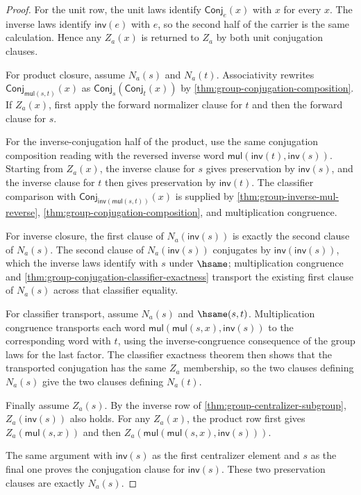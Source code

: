 \begin{proof}
For the unit row, the unit laws identify $\mathsf{Conj}_e(x)$ with $x$ for
every $x$. The inverse laws identify $\mathsf{inv}(e)$ with $e$, so the
second half of the carrier is the same calculation. Hence any $Z_a(x)$ is
returned to $Z_a$ by both unit conjugation clauses.

For product closure, assume $N_a(s)$ and $N_a(t)$. Associativity rewrites
$\mathsf{Conj}_{\mathsf{mul}(s,t)}(x)$ as
$\mathsf{Conj}_s(\mathsf{Conj}_t(x))$ by
\autoref{thm:group-conjugation-composition}. If $Z_a(x)$, first apply the
forward normalizer clause for $t$ and then the forward clause for $s$.

For the inverse-conjugation half of the product, use the same conjugation
composition reading with the reversed inverse word
$\mathsf{mul}(\mathsf{inv}(t),\mathsf{inv}(s))$. Starting from $Z_a(x)$, the
inverse clause for $s$ gives preservation by $\mathsf{inv}(s)$, and the inverse
clause for $t$ then gives preservation by $\mathsf{inv}(t)$. The classifier
comparison with $\mathsf{Conj}_{\mathsf{inv}(\mathsf{mul}(s,t))}(x)$ is supplied
by \autoref{thm:group-inverse-mul-reverse},
\autoref{thm:group-conjugation-composition}, and multiplication congruence.

For inverse closure, the first clause of $N_a(\mathsf{inv}(s))$ is exactly the
second clause of $N_a(s)$. The second clause of
$N_a(\mathsf{inv}(s))$ conjugates by $\mathsf{inv}(\mathsf{inv}(s))$, which
the inverse laws identify with $s$ under $\hsame$; multiplication congruence
and \autoref{thm:group-conjugation-classifier-exactness} transport the
existing first clause of $N_a(s)$ across that classifier equality.

For classifier transport, assume $N_a(s)$ and $\hsame(s,t)$. Multiplication
congruence transports each word
$\mathsf{mul}(\mathsf{mul}(s,x),\mathsf{inv}(s))$ to the corresponding word
with $t$, using the inverse-congruence consequence of the group laws for the
last factor. The classifier exactness theorem then shows that the transported
conjugation has the same $Z_a$ membership, so the two clauses defining
$N_a(s)$ give the two clauses defining $N_a(t)$.

Finally assume $Z_a(s)$. By the inverse row of
\autoref{thm:group-centralizer-subgroup}, $Z_a(\mathsf{inv}(s))$ also holds.
For any $Z_a(x)$, the product row first gives
$Z_a(\mathsf{mul}(s,x))$ and then
$Z_a(\mathsf{mul}(\mathsf{mul}(s,x),\mathsf{inv}(s)))$.

The same argument with $\mathsf{inv}(s)$ as the first centralizer element and
$s$ as the final one proves the conjugation clause for $\mathsf{inv}(s)$.
These two preservation clauses are exactly $N_a(s)$.
\end{proof}

